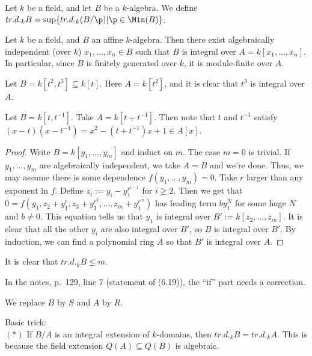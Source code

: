  \begin{definition}
   Let $k$ be a field, and let $B$ be a $k$-algebra. We define $tr.d._k B = \sup
   \{tr.d._k (B/\p)|\p\in \Min(B)\}$.
 \end{definition}
 \begin{theorem}
   Let $k$ be a field, and $B$ an affine $k$-algebra. Then there exist algebraically
   independent (over $k$) $x_1,\dots, x_n\in B$ such that $B$ is integral over
   $A=k[x_1,\dots, x_n]$. In particular, since $B$ is finitely generated over $k$, it is
   module-finite over $A$.
 \end{theorem}
 \begin{example}
   Let $B=k[t^2,t^3]\subseteq k[t]$. Here $A=k[t^2]$, and it is clear that $t^3$ is
   integral over $A$.
 \end{example}
 \begin{example}
   Let $B=k[t,t^{-1}]$. Take $A=k[t+t^{-1}]$. Then note that $t$ and $t^{-1}$ satisfy
   $(x-t)(x-t^{-1}) = x^2-(t+t^{-1})x+1\in A[x]$.
 \end{example}
 \begin{proof}
   Write $B=k[y_1,\dots, y_m]$ and induct on $m$. The case $m=0$ is trivial. If
   $y_1,\dots, y_m$ are algebraically independent, we take $A=B$ and we're done. Thus, we
   may assume there is some dependence $f(y_1,\dots, y_m)=0$. Take $r$ larger than any
   exponent in $f$. Define $z_i:=y_i-y_1^{r^{i-1}}$ for $i\ge 2$. Then we get that
   $0=f(y_1,z_2+y_1^{r}, z_3+y_1^{r^2}, \dots, z_m + y_1^{r^m})$ has leading term
   $by_1^N$ for some huge $N$ and $b\neq 0$. This equation tells us that $y_1$ is
   integral over $B':=k[z_2,\dots, z_m]$. It is clear that all the other $y_i$ are also
   integral over $B'$, so $B$ is integral over $B'$. By induction, we can find a
   polynomial ring $A$ so that $B'$ is integral over $A$.
 \end{proof}
 It is clear that $tr.d._k B\le m$.
 \setcounter{lecture}{41}

 In the notes, p.~129, line 7 (statement of (6.19)), the ``if'' part needs a correction.

 We replace $B$ by $S$ and $A$ by $R$.

 Basic trick:\\
 $(\ast)$ If $B/A$ is an integral extension of $k$-domains, then $tr.d._k B=tr.d._k A$.
 This is because the field extension $Q(A)\subseteq Q(B)$ is algebraic.

